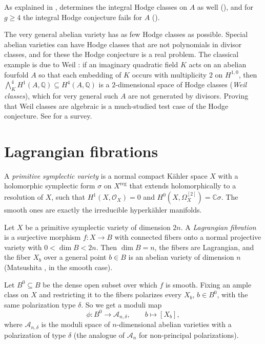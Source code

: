 \documentclass[12pt]{amsart}
\newcommand{\Q}{\mathbb{Q}}
\newcommand{\C}{\mathbb{C}}
\newcommand{\cA}{\mathcal{A}}
\newcommand{\cO}{\mathcal{O}}
\let\oldbigwedge\bigwedge
\renewcommand{\bigwedge}{\mathop{\textstyle\oldbigwedge}\nolimits}
\theoremstyle{definition}
\theoremstyle{remark}
\numberwithin{equation}{section}
\begin{document}
As explained in ,  determines
the integral Hodge classes on $A$ as well (), and for
$g \geq 4$ the integral Hodge conjecture fails for $A$ ().

\begin{remark}
    The very general abelian variety has as few Hodge classes as possible.
    Special abelian varieties can have Hodge classes that are not polynomials
    in divisor classes, and for these the Hodge conjecture is a real problem.
    The classical example is due to Weil \cite{Weil77}: if an imaginary
    quadratic field $K$ acts on an abelian fourfold $A$ so that each embedding
    of $K$ occurs with multiplicity $2$ on $H^{1,0}$, then
    $\bigwedge^4_K H^1(A, \Q) \subseteq H^4(A, \Q)$ is a $2$-dimensional space of
    Hodge classes (\emph{Weil classes}), which for very general such $A$ are
    not generated by divisors. Proving that Weil classes are algebraic is a
    much-studied test case of the Hodge conjecture. See \cite{Gordon99} for a
    survey.
\end{remark}

\section{Lagrangian fibrations}

\begin{definition}
    A \emph{primitive symplectic variety} is a normal compact K\"ahler space
    $X$ with a holomorphic symplectic form $\sigma$ on $X^{\mathrm{reg}}$ that
    extends holomorphically to a resolution of $X$, such that
    $H^1(X, \cO_X) = 0$ and $H^0(X, \Omega_X^{[2]}) = \C \sigma$. The smooth
    ones are exactly the irreducible hyperk\"ahler manifolds.
\end{definition}

Let $X$ be a primitive symplectic variety of dimension $2n$. A
\emph{Lagrangian fibration} is a surjective morphism $f \colon X \to B$ with
connected fibers onto a normal projective variety with
$0 < \dim B < 2n$. Then $\dim B = n$, the fibers are Lagrangian, and the fiber
$X_b$ over a general point $b \in B$ is an abelian variety of dimension $n$
(Matsushita \cite{Matsushita99}, in the smooth case).

Let $B^0 \subseteq B$ be the dense open subset over which $f$ is smooth. Fixing
an ample class on $X$ and restricting it to the fibers polarizes every $X_b$,
$b \in B^0$, with the same polarization type $\delta$. So we get a moduli map
\begin{equation*}
    \phi \colon B^0 \to \cA_{n, \delta}, \qquad b \mapsto [X_b],
\end{equation*}
where $\cA_{n,\delta}$ is the moduli space of $n$-dimensional abelian
varieties with a polarization of type $\delta$ (the analogue of $\cA_n$ for
non-principal polarizations).
\end{document}
